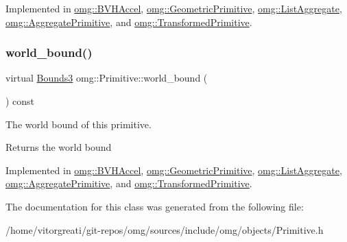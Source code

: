 Implemented in \mbox{\hyperlink{classomg_1_1_b_v_h_accel_a110cd424f8f4d628668cb500ff3c6e7a}{omg\+::\+B\+V\+H\+Accel}}, \mbox{\hyperlink{classomg_1_1_geometric_primitive_a797a2eb74fb48a7e25c7f98f16c604a7}{omg\+::\+Geometric\+Primitive}}, \mbox{\hyperlink{classomg_1_1_list_aggregate_ac3abd78ca5ce87eb3821bf19bf5194cf}{omg\+::\+List\+Aggregate}}, \mbox{\hyperlink{classomg_1_1_aggregate_primitive_af6009e1c54b0f2341d78d95afb4268cc}{omg\+::\+Aggregate\+Primitive}}, and \mbox{\hyperlink{classomg_1_1_transformed_primitive_a74303debd3737dd5d73de33507e36ecf}{omg\+::\+Transformed\+Primitive}}.

\mbox{\label{classomg_1_1_primitive_a457b29547bc918cf8874b24f5168ff86}} 
\subsubsection{\texorpdfstring{world\_bound()}{world\_bound()}}
{\footnotesize\ttfamily virtual \mbox{\hyperlink{classomg_1_1_bounds3}{Bounds3}} omg\+::\+Primitive\+::world\+\_\+bound (\begin{DoxyParamCaption}{ }\end{DoxyParamCaption}) const\hspace{0.3cm}{\ttfamily [pure virtual]}}



The world bound of this primitive. 

\begin{DoxyReturn}{Returns}
the world bound 
\end{DoxyReturn}


Implemented in \mbox{\hyperlink{classomg_1_1_b_v_h_accel_a8de5010cc4ddf9e0673461d711b9930b}{omg\+::\+B\+V\+H\+Accel}}, \mbox{\hyperlink{classomg_1_1_geometric_primitive_ae8f0945c180c43e32cad4faa75185522}{omg\+::\+Geometric\+Primitive}}, \mbox{\hyperlink{classomg_1_1_list_aggregate_a8c7b3a6c7c8a087355a1a35519c79555}{omg\+::\+List\+Aggregate}}, \mbox{\hyperlink{classomg_1_1_aggregate_primitive_ad8a385aaa01354acffad18fe8f23fa25}{omg\+::\+Aggregate\+Primitive}}, and \mbox{\hyperlink{classomg_1_1_transformed_primitive_a5478871a0d44380d5e64301746d6774b}{omg\+::\+Transformed\+Primitive}}.



The documentation for this class was generated from the following file\+:\begin{DoxyCompactItemize}
\item 
/home/vitorgreati/git-\/repos/omg/sources/include/omg/objects/Primitive.\+h\end{DoxyCompactItemize}
